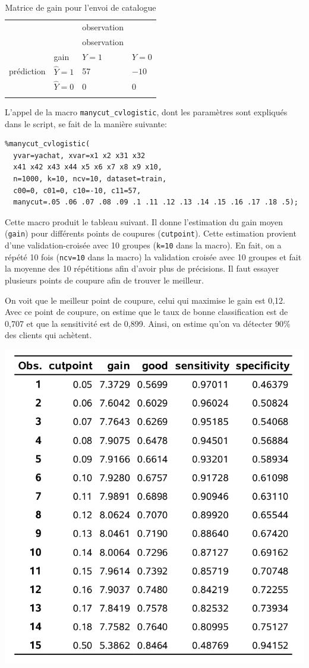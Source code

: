 \documentclass[
  11pt,
  letterpaper,
]{book}
\theoremstyle{definition}
\theoremstyle{definition}
\theoremstyle{definition}
\theoremstyle{remark}
\begin{document}
\begin{longtable}[]{@{}llll@{}}
\caption{\label{tab:03-gain3} Matrice de gain pour l'envoi de catalogue}\tabularnewline
\toprule
& & observation & \\ \addlinespace
\midrule
\endfirsthead
\toprule
& & observation & \\ \addlinespace
\midrule
\endhead
& gain & \(Y=1\) & \(Y=0\) \\ \addlinespace
prédiction & \(\widehat{Y}=1\) & 57 & \(-10\) \\ \addlinespace
& \(\widehat{Y}=0\) & 0 & 0 \\ \addlinespace
\bottomrule
\end{longtable}

L'appel de la macro \texttt{manycut\_cvlogistic}, dont les paramètres sont expliqués dans le script, se fait de la manière suivante:

\begin{verbatim}
%manycut_cvlogistic(
  yvar=yachat, xvar=x1 x2 x31 x32 
  x41 x42 x43 x44 x5 x6 x7 x8 x9 x10,
  n=1000, k=10, ncv=10, dataset=train,
  c00=0, c01=0, c10=-10, c11=57,
  manycut=.05 .06 .07 .08 .09 .1 .11 .12 .13 .14 .15 .16 .17 .18 .5);
\end{verbatim}

Cette macro produit le tableau suivant. Il donne l'estimation du gain moyen (\texttt{gain}) pour différents points de coupures (\texttt{cutpoint}). Cette estimation provient d'une validation-croisée avec 10 groupes (\texttt{k=10} dans la macro). En fait, on a répété 10 fois (\texttt{ncv=10} dans la macro) la validation croisée avec 10 groupes et fait la moyenne des 10 répétitions afin d'avoir plus de précisions. Il faut essayer plusieurs points de coupure afin de trouver le meilleur.

On voit que le meilleur point de coupure, celui qui maximise le gain est 0,12. Avec ce point de coupure, on estime que le taux de bonne classification est de 0,707 et que la sensitivité est de 0,899. Ainsi, on estime qu'on va détecter 90\% des clients qui achètent.

\begin{center}\includegraphics[width=0.6\linewidth]{figures/03-logistic-e19} \end{center}
\end{document}
